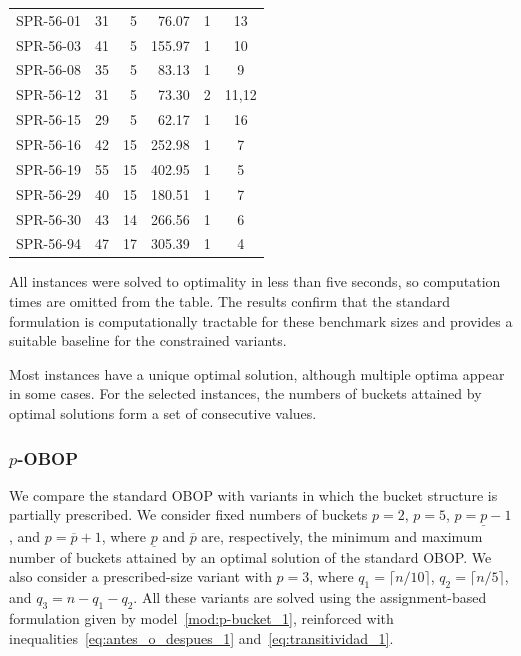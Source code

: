 \documentclass[pdflatex,basic,Numbered]{jnl}%
\theoremstyle{plain}
\theoremstyle{remark}
\theoremstyle{thmstyleone}%
\theoremstyle{thmstylethree}%
\begin{document}
\begin{longtable}{lrrrrc}
SPR-56-01 & 31 & 5 & 76.07 & 1 & 13 \\
SPR-56-03 & 41 & 5 & 155.97 & 1 & 10 \\
SPR-56-08 & 35 & 5 & 83.13 & 1 & 9 \\
SPR-56-12 & 31 & 5 & 73.30 & 2 & 11,12 \\
SPR-56-15 & 29 & 5 & 62.17 & 1 & 16 \\
SPR-56-16 & 42 & 15 & 252.98 & 1 & 7 \\
SPR-56-19 & 55 & 15 & 402.95 & 1 & 5 \\
SPR-56-29 & 40 & 15 & 180.51 & 1 & 7 \\
SPR-56-30 & 43 & 14 & 266.56 & 1 & 6 \\
SPR-56-94 & 47 & 17 & 305.39 & 1 & 4 \\

\end{longtable}
\endgroup

All instances were solved to optimality in less than five seconds, so computation times are omitted from the table. The results confirm that the standard formulation is computationally tractable for these benchmark sizes and provides a suitable baseline for the constrained variants.

Most instances have a unique optimal solution, although multiple optima appear in some cases. For the selected instances, the numbers of buckets attained by optimal solutions form a set of consecutive values.

\subsubsection{\texorpdfstring{$p$}{p}-{\rm OBOP}}

We compare the standard {\rm OBOP} with variants in which the bucket structure is partially prescribed. We consider fixed numbers of buckets \(p=2\), \(p=5\), \(p=\underline p-1\), and \(p=\overline p+1\), where \(\underline p\) and \(\overline p\) are, respectively, the minimum and maximum number of buckets attained by an optimal solution of the standard {\rm OBOP}. We also consider a prescribed-size variant with \(p=3\), where \(q_1=\lceil n/10\rceil\), \(q_2=\lceil n/5\rceil\), and \(q_3=n-q_1-q_2\). All these variants are solved using the assignment-based formulation given by model~\eqref{mod:p-bucket_1}, reinforced with inequalities~\eqref{eq:antes_o_despues_1} and~\eqref{eq:transitividad_1}.
\end{document}
